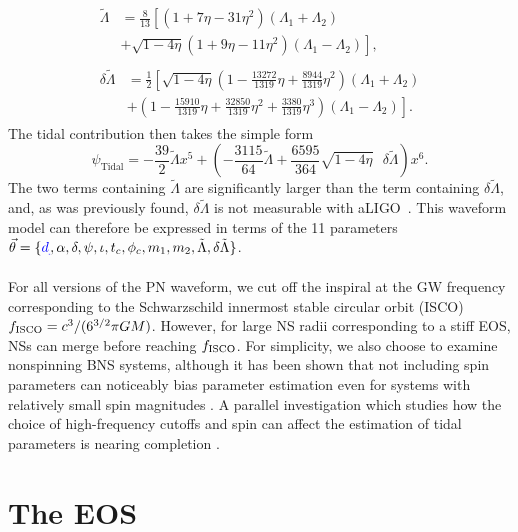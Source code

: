 \documentclass[twocolumn,prd,amssymb,aps,nofootinbib,showpacs,epsf]{revtex4}
\newcommand\les[2]{\textcolor{blue}{{#1}\sout{#2}}}
\begin{document}
\begin{align}
\begin{split}
\label{eq:LT}
\tilde{\Lambda}&=\frac{8}{13}\left[\left(1+7\eta-31\eta^2\right)\left(\Lambda_1+\Lambda_2\right)\right.\\
&+ \left.\sqrt{1-4\eta}\left(1+9\eta-11\eta^2\right)\left(\Lambda_1-\Lambda_2\right)\right],
\end{split}\\
\begin{split}
\label{eq:dLT}
\delta\tilde{\Lambda}&=\frac{1}{2}\left[\sqrt{1-4\eta}\left(1-\frac{13272}{1319}\eta+\frac{8944}{1319}\eta^2\right)\left(\Lambda_1+\Lambda_2\right) \right .\\
& + \left . \left(1-\frac{15910}{1319}\eta+\frac{32850}{1319}\eta^2+\frac{3380}{1319}\eta^3\right)\left(\Lambda_1-\Lambda_2\right)\right].
\end{split}
\end{align}
The tidal contribution then takes the simple form
\begin{equation}
\label{eq:psi_tidal}
\psi_\text{Tidal} = -\frac{39}{2}\tilde{\Lambda} x^5+ \left(-\frac{3115}{64}\tilde{\Lambda}+\frac{6595}{364}\sqrt{1-4\eta}\mbox{ }\delta\tilde{\Lambda}\right) x^6.
\end{equation}
The two terms containing $\tilde\Lambda$ are significantly larger than the term containing $\delta\tilde\Lambda$, and, as was previously found, $\delta\tilde\Lambda$ is not measurable with aLIGO~\cite{WadeCreightonOchsner2014}. This waveform model can therefore be expressed in terms of the 11 parameters $\vec\theta = \{\les{d}{}, \alpha, \delta, \psi, \iota, t_c, \phi_c, m_1, m_2, \tilde\Lambda, \delta\tilde\Lambda\}$.

For all versions of the PN waveform, we cut off the inspiral at the GW frequency corresponding to the Schwarzschild innermost stable circular orbit (ISCO) $f_{\rm ISCO} = c^3/(6^{3/2}\pi G M)$.  However, for large NS radii corresponding to a stiff EOS, NSs can merge before reaching $f_{\rm ISCO}$. For simplicity, we also choose to examine nonspinning BNS systems, although it has been shown that not including spin parameters can noticeably bias parameter estimation even for systems with relatively small spin magnitudes \cite{Favata2014}. A parallel investigation which studies how the choice of high-frequency cutoffs and spin can affect the estimation of tidal parameters is nearing completion \cite{Agathos2014}.


\section{The EOS}
\label{sec:eos}
\end{document}
